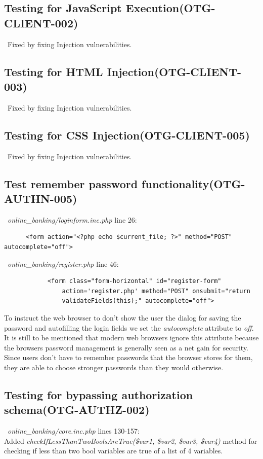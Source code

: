 \documentclass[headsepline,footsepline,footinclude=false,oneside,fontsize=11pt,paper=a4,listof=totoc,bibliography=totoc]{scrbook} %
\begin{document}
 
\subsection{Testing for JavaScript Execution(OTG-CLIENT-002)}\
Fixed by fixing Injection vulnerabilities. \\

 
\subsection{Testing for HTML Injection(OTG-CLIENT-003)}\
Fixed by fixing Injection vulnerabilities.\\ 

\subsection{Testing for CSS Injection(OTG-CLIENT-005)}\
Fixed by fixing Injection vulnerabilities.

\subsection{Test remember password functionality(OTG-AUTHN-005)}\
\textit{online\_banking/loginform.inc.php} line 26:
\begin{lstlisting} 
      <form action="<?php echo $current_file; ?>" method="POST" autocomplete="off">
\end{lstlisting}\
\textit{online\_banking/register.php} line 46:
\begin{lstlisting} 
			<form class="form-horizontal" id="register-form" 
				action='register.php' method="POST" onsubmit="return
				validateFields(this);" autocomplete="off">
\end{lstlisting} 

To instruct the web browser to don't show the user the dialog for saving the password and autofilling the login fields we set the \textit{autocomplete} attribute to \textit{off}. \\

It is still to be mentioned that modern web browsers ignore this attribute because the browsers password management is generally seen as a net gain for security. Since users don't have to remember passwords that the browser stores for them, they are able to choose stronger passwords than they would otherwise.

\subsection{Testing for bypassing authorization schema(OTG-AUTHZ-002)}\
\textit{online\_banking/core.inc.php} lines 130-157:\\
Added \textit{checkIfLessThanTwoBoolsAreTrue(\$var1, \$var2, \$var3, \$var4)} method for checking if less than two bool variables are true of a list of 4 variables.\\
\end{document}
